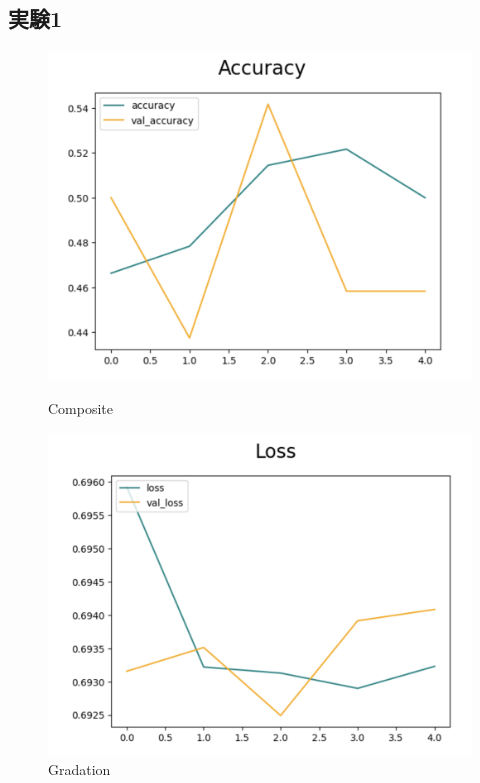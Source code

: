 \documentclass[a4paper, 11pt, titlepage]{jsarticle}
\begin{document}
\subsection{実験1}
\begin{figure}[htbp]
  \begin{minipage}[b]{0.45\linewidth}
    \centering
    \includegraphics[keepaspectratio, scale=0.32]{ex1_acc.png}
    \caption{Composite}
  \end{minipage}
  \begin{minipage}[b]{0.45\linewidth}
    \centering
    \includegraphics[keepaspectratio, scale=0.32]{ex1_loss.png}
    \caption{Gradation}
  \end{minipage}
\end{figure}
\end{document}
